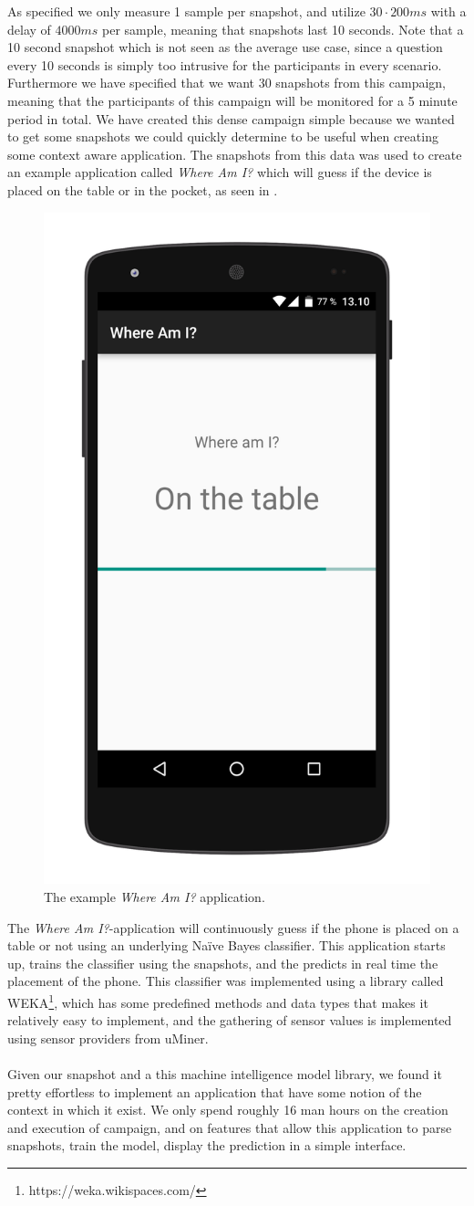 As specified we only measure 1 sample per snapshot, and utilize $30 \cdot 200ms$  with a delay of $4000ms$ per sample, meaning that snapshots last 10 seconds. Note that a 10 second snapshot which is not seen as the average use case, since a question every 10 seconds is simply too intrusive for the participants in every scenario. Furthermore we have specified that we want 30 snapshots from this campaign, meaning that the participants of this campaign will be monitored for a 5 minute period in total. We have created this dense campaign simple because we wanted to get some snapshots we could quickly determine to be useful when creating some context aware application. The snapshots from this data was used to create an example application called \emph{Where Am I?} which will guess if the device is placed on the table or in the pocket, as seen in .

\begin{figure}[!htbp]
    \centering
    \includegraphics[width=.35\textwidth ]{graphic/quality_assurance/where_am_i_app.png}
    \caption{The example \emph{Where Am I?} application.}
    \label{fig:where_am_i_app}
\end{figure}
\FloatBarrier

The \emph{Where Am I?}-application will continuously guess if the phone is placed on a table or not using an underlying Naïve Bayes classifier. This application starts up, trains the classifier using the snapshots, and the predicts in real time the placement of the phone. This classifier was implemented using a library called WEKA\footnote{https://weka.wikispaces.com/}, which has some predefined methods and data types that makes it relatively easy to implement, and the gathering of sensor values is implemented using sensor providers from uMiner.
\\\\
Given our snapshot and a this machine intelligence model library, we found it pretty effortless to implement an application that have some notion of the context in which it exist. We only spend roughly 16 man hours on the creation and execution of campaign, and on features that allow this application to parse snapshots, train the model, display the prediction in a simple interface.